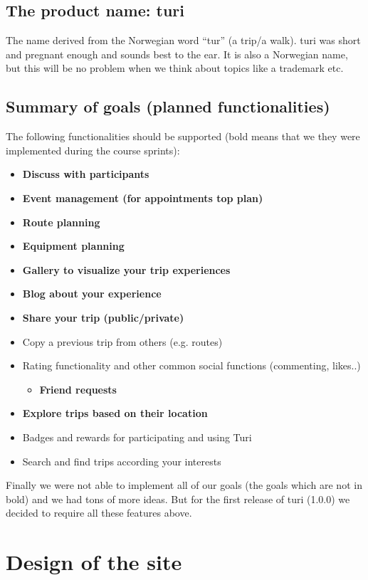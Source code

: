 \documentclass[a4paper]{article}
\begin{document}
\subsection{The product name: turi}
The name derived from the Norwegian word “tur” (a trip/a walk). turi was short and pregnant enough and sounds best to the ear. It is also a Norwegian name, but this will be no problem when we think about topics like a trademark etc.

\subsection{Summary of goals (planned functionalities)}
The following functionalities should be supported (bold means that we they were implemented during the course sprints):
\begin{itemize}
  \item {\textbf{Discuss with participants}}
  \item {\textbf{Event management (for appointments top plan)}}
  \item {\textbf{Route planning}}
  \item {\textbf{Equipment planning}}
  \item {\textbf{Gallery to visualize your trip experiences}}
  \item {\textbf{Blog about your experience}}
  \item {\textbf{Share your trip (public/private)}}
  \item {Copy a previous trip from others (e.g. routes)}
  \item {Rating functionality and other common social functions (commenting, likes..)
  \begin{itemize}
    \item {\textbf{Friend requests}}
  \end{itemize}}
  \item {\textbf{Explore trips based on their location}}
  \item {Badges and rewards for participating and using Turi}
  \item {Search and find trips according your interests}
\end{itemize}

\noindent
Finally we were not able to implement all of our goals (the goals which are not in bold) and we had tons of more ideas. But for the first release of turi (1.0.0) we decided to require all these features above.\\


\section{Design of the site}
\end{document}
